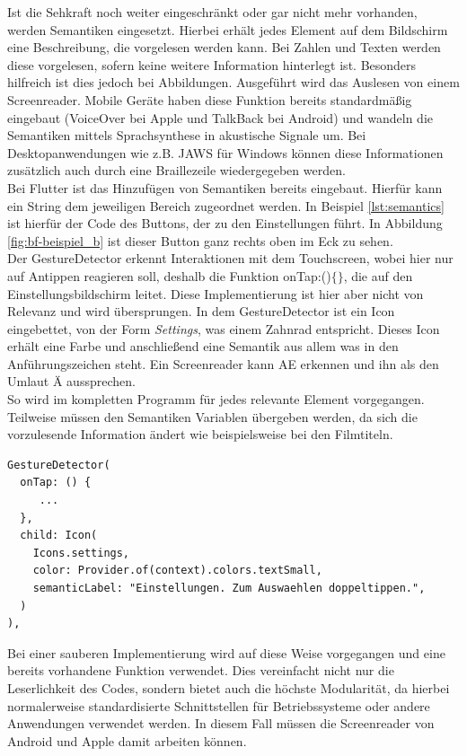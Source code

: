\noindent
Ist die Sehkraft noch weiter eingeschränkt oder gar nicht mehr vorhanden, werden Semantiken eingesetzt. Hierbei erhält jedes Element auf dem Bildschirm eine Beschreibung, die vorgelesen werden kann. Bei Zahlen und Texten werden diese vorgelesen, sofern keine weitere Information hinterlegt ist. Besonders hilfreich ist dies jedoch bei Abbildungen. Ausgeführt wird das Auslesen von einem Screenreader. Mobile Geräte haben diese Funktion bereits standardmäßig eingebaut (VoiceOver bei Apple und TalkBack bei Android) und wandeln die Semantiken mittels Sprachsynthese in akustische Signale um. Bei Desktopanwendungen wie z.B. JAWS für Windows können diese Informationen zusätzlich auch durch eine Braillezeile wiedergegeben werden.\\
Bei Flutter ist das Hinzufügen von Semantiken bereits eingebaut. Hierfür kann ein String dem jeweiligen Bereich zugeordnet werden. In Beispiel \ref{lst:semantics} ist hierfür der Code des Buttons, der zu den Einstellungen führt. In Abbildung \ref{fig:bf-beispiel_b} ist dieser Button ganz rechts oben im Eck zu sehen.\\
Der GestureDetector erkennt Interaktionen mit dem Touchscreen, wobei hier nur auf Antippen reagieren soll, deshalb die Funktion onTap:()$\{\}$, die auf den Einstellungsbildschirm leitet. Diese Implementierung ist hier aber nicht von Relevanz und wird übersprungen. In dem GestureDetector ist ein Icon eingebettet, von der Form \textit{Settings}, was einem Zahnrad entspricht. Dieses Icon erhält eine Farbe und anschließend eine Semantik aus allem was in den Anführungszeichen steht. Ein Screenreader kann AE erkennen und ihn als den Umlaut Ä aussprechen. \\
So wird im kompletten Programm für jedes relevante Element vorgegangen. Teilweise  müssen den Semantiken Variablen übergeben werden, da sich die vorzulesende Information ändert wie beispielsweise bei den Filmtiteln.
    
\begin{lstlisting}[caption=Codeausschnitt in Dart von einem Button mit Semantiken.,label=lst:semantics]
GestureDetector(
  onTap: () {
     ...
  },
  child: Icon(
    Icons.settings,
    color: Provider.of(context).colors.textSmall,
    semanticLabel: "Einstellungen. Zum Auswaehlen doppeltippen.",
  )
),
\end{lstlisting}

\noindent
Bei einer sauberen Implementierung wird auf diese Weise vorgegangen und eine bereits vorhandene Funktion verwendet. Dies vereinfacht nicht nur die Leserlichkeit des Codes, sondern bietet auch die höchste Modularität, da hierbei normalerweise standardisierte Schnittstellen für Betriebssysteme oder andere Anwendungen verwendet werden. In diesem Fall  müssen die Screenreader von Android und Apple damit arbeiten können.\\

